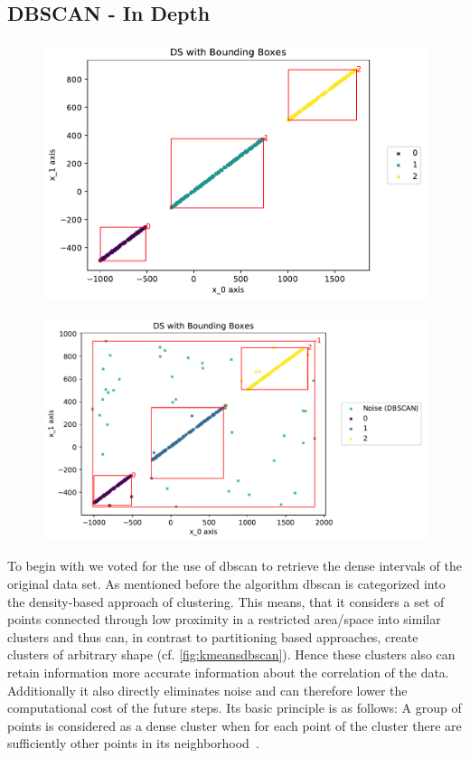\subsection{DBSCAN - In Depth}
\label{ssec:DBSCANindepth}
\begin{figure}
    \centering
    \begin{minipage}{.47\textwidth}
      \centering
      \includegraphics[width=.8\textwidth]{figures/DSwithDBSCANBoundingBoxes.pdf}
      \label{fig:test1}
    \end{minipage}%
    \begin{minipage}{.53 \textwidth}
      \centering
      \includegraphics[width=.8\textwidth]{figures/DBSCANwithNoise.pdf}
      \label{fig:test2}
    \end{minipage}
\end{figure}
To begin with we voted for the use of \gls{dbscan} to retrieve the dense intervals of the original data set. 
As mentioned before the algorithm \gls{dbscan} is categorized into the density-based approach of clustering. This means, that it considers a set of points connected through low proximity in a restricted area/space into similar clusters and thus can, in contrast to partitioning based approaches, create clusters of arbitrary shape (cf. \autoref{fig:kmeansdbscan}). Hence these clusters also can retain information more accurate information about the correlation of the data. Additionally it also directly eliminates noise and can therefore lower the computational cost of the future steps. Its basic principle is as follows:
A group of points is considered as a dense cluster when for each point of the cluster there are sufficiently other points in its neighborhood~\cite{DBSCANEKSX96}.

